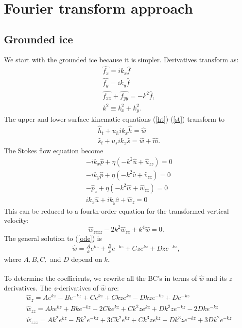 \documentclass[paper=a4, fontsize=11pt]{article}
\begin{document}
\section*{Fourier transform approach}
\subsection*{Grounded ice}
We start with the grounded ice because it is simpler.
Derivatives transform as:
\begin{align}
&\widehat{f_x} = ik_x\widehat{f} \\
&\widehat{f_y} = ik_y\widehat{f} \\
&\widehat{f_{xx}} + \widehat{f_{yy}} = -k^2 \widehat{f}, \\ &k^2 \equiv k_x^2 + k_y^2.
\end{align}
The upper and lower surface kinematic equations (\ref{ht})-(\ref{st}) transform to
\begin{align}
&\widehat{h}_t + u_h ik_x \widehat{h} = \widehat{w}\label{hthat}\\
&\widehat{s}_t + u_s ik_x \widehat{s} = \widehat{w}+\widehat{m}.\label{sthat}
\end{align}
The Stokes flow equation become
\begin{align}
&-ik_x\widehat{p} + \eta ( -k^2\widehat{u} + \widehat{u}_{zz}) = 0 \\
&-ik_y\widehat{p} + \eta ( -k^2\widehat{v} + \widehat{v}_{zz}) = 0 \\
&-\widehat{p}_z + \eta (-k^2\widehat{w} + \widehat{w}_{zz}) = 0 \\
&ik_x\widehat{u} + ik_y\widehat{v} + \widehat{w}_z = 0
\end{align}
This can be reduced to a fourth-order equation for the transformed vertical velocity:
\begin{equation}
\widehat{w}_{zzzz} - 2k^2 \widehat{w}_{zz} + k^4 \widehat{w}=0. \label{ode}
\end{equation}
The general solution to (\ref{ode}) is
\begin{align}
\widehat{w} = \frac{A}{k}e^{k z} + \frac{B}{k}e^{-k z} + {C}ze^{k z}+ {D}ze^{-k z},
\end{align}
where $A,B,C,$ and $D$ depend on $k$.\\ \\
To determine the coefficients, we rewrite all the BC's in terms of $\widehat{w}$ and its $z$ derivatives.
The $z$-derivatives of $\widehat{w}$ are:
\begin{align}
&\widehat{w}_{z} = {A}e^{k z} - {B}e^{-k z} + {C}e^{k z} + {C}kze^{k z} - {D}kze^{-k z} + {D}e^{-k z} \\
&\widehat{w}_{zz} = {Ak}e^{k z} + {Bk}e^{-k z} + {2Ck}e^{k z} + {C}k^2 ze^{k z} + {D}k^2ze^{-k z} - {2Dk}e^{-k z} \\
&\widehat{w}_{zzz} = {Ak^2}e^{k z} - {Bk^2}e^{-k z} + {3Ck^2}e^{k z} + {C}k^3 ze^{k z} - {D}k^3ze^{-k z} + {3Dk^2}e^{-k z}
\end{align}
\end{document}

